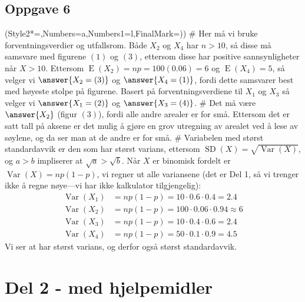 \subsection*{Oppgave 6}
\begin{easylist}[enumerate]
\ListProperties(Style2*=,Numbers=a,Numbers1=l,FinalMark={)})
# Her må vi bruke forventningsverdier og utfallsrom. Både $X_2$ og $X_4$ har $n > 10$, så disse må samsvare med figurene $(1)$ og $(3)$, ettersom disse har positive sannsynligheter når $X > 10$.
Ettersom $\operatorname{E}(X_2) = np = 100(0.06) = 6$ og $\operatorname{E}(X_4) = 5$, så velger vi $\answer{X_2 = (3)}$ og $\answer{X_4 = (1)}$,
fordi dette samsvarer best med høyeste stolpe på figurene.
Basert på forventningsverdiene til $X_1$ og $X_3$ så velger vi $\answer{X_1 = (2)}$ og $\answer{X_3 = (4)}$.
# Det må være $\answer{X_2}$ (figur $(3)$), fordi alle andre arealer er for små.
Ettersom det er satt tall på aksene er det mulig å gjøre en grov utregning av arealet ved å lese av søylene, og da ser man at de andre er for små.
# Variabelen med størst standardavvik er den som har størst varians, ettersom
$\operatorname{SD}(X) = \sqrt{\operatorname{Var}(X)}$, og $a > b$ impliserer at $\sqrt{a} > \sqrt{b}$.
Når $X$ er binomisk fordelt er $\operatorname{Var}(X) = np(1-p)$, vi regner ut alle variansene (det er Del 1, så vi trenger ikke å regne nøye---vi har ikke kalkulator tilgjengelig):
\begin{align*}
\operatorname{Var}(X_1) &= np(1-p) = 10 \cdot 0.6 \cdot 0.4 = 2.4 \\ 
\operatorname{Var}(X_2) &= np(1-p) = 100 \cdot 0.06 \cdot 0.94 \approx 6 \\
\operatorname{Var}(X_3) &= np(1-p) = 10 \cdot 0.4 \cdot 0.6 = 2.4 \\
\operatorname{Var}(X_4) &= np(1-p) = 50 \cdot 0.1 \cdot 0.9 = 4.5
\end{align*}
Vi ser at   har størst varians, og derfor også størst standardavvik.
\end{easylist}




\section*{Del 2 - med hjelpemidler}

